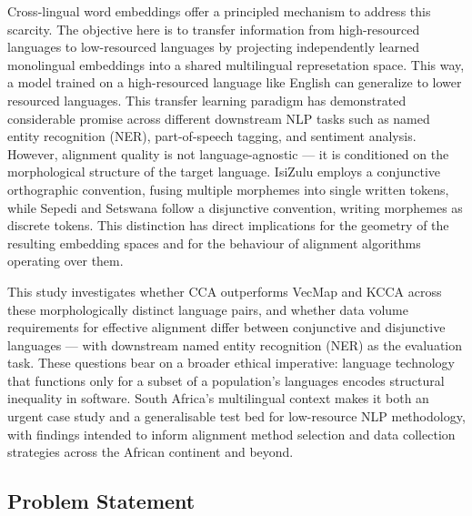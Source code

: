 \documentclass[11pt]{article}
\begin{document}
Cross-lingual word embeddings offer a principled mechanism to address
this scarcity. The objective here is to transfer information from
high-resourced languages to low-resourced languages by projecting 
independently learned monolingual embeddings into a shared multilingual
represetation space. This way, a model trained on a high-resourced
language like English can generalize to lower resourced languages. This
transfer learning paradigm has demonstrated considerable promise across
different downstream NLP tasks such as named entity recognition (NER), 
part-of-speech tagging, and sentiment analysis. However, alignment quality 
is not language-agnostic — it is conditioned on the morphological structure 
of the target language. IsiZulu employs a conjunctive orthographic convention, 
fusing multiple morphemes into single written tokens, while Sepedi and Setswana 
follow a disjunctive convention, writing morphemes as discrete tokens. This 
distinction has direct implications for the geometry of the resulting embedding 
spaces and for the behaviour of alignment algorithms operating over them.

This study investigates whether CCA outperforms VecMap and KCCA across these 
morphologically distinct language pairs, and whether data volume requirements 
for effective alignment differ between conjunctive and disjunctive languages 
— with downstream named entity recognition (NER) as the evaluation task. These 
questions bear on a broader ethical imperative: language technology that functions 
only for a subset of a population's languages encodes structural inequality in software. 
South Africa's multilingual context makes it both an urgent case study and a 
generalisable test bed for low-resource NLP methodology, with findings intended to 
inform alignment method selection and data collection strategies across the African 
continent and beyond.

\subsection{Problem Statement}
\end{document}
